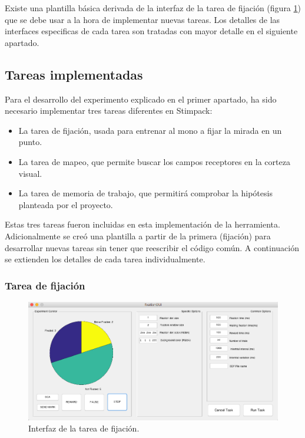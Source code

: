 \documentclass[conference]{IEEEtran}
\begin{document}
Existe una plantilla básica derivada de la interfaz de la tarea de fijación (figura \ref{figfixGUI}) que se debe usar a la hora de implementar nuevas tareas.
Los detalles de las interfaces especificas de cada tarea son tratadas con mayor detalle en el siguiente apartado.

\subsection{Tareas implementadas}

Para el desarrollo del experimento explicado en el primer apartado, ha sido necesario implementar tres tareas diferentes en Stimpack:
\begin{itemize}
	\item La tarea de fijación, usada para entrenar al mono a fijar la mirada en un punto.
	\item La tarea de mapeo, que permite buscar los campos receptores en la corteza visual. 
	\item La tarea de memoria de trabajo, que permitirá comprobar la hipótesis planteada por el proyecto.
\end{itemize}
Estas tres tareas fueron incluidas en esta implementación de la herramienta. Adicionalmente se creó una plantilla a partir de la primera (fijación) para desarrollar nuevas tareas sin tener que reescribir el código común. 
A continuación se extienden los detalles de cada tarea individualmente.

\subsubsection*{Tarea de fijación}
\begin{figure}[tp]
\centerline{\includegraphics[width=\linewidth]{figures/fixation_gui}}
\caption{Interfaz de la tarea de fijación.}
\label{figfixGUI}
\end{figure}
\end{document}
